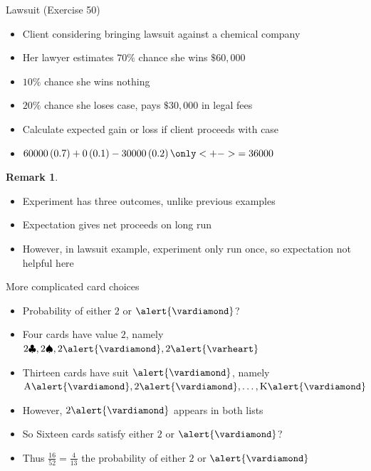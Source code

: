 \documentclass[handout]{beamer}
\theoremstyle{definition}
\newtheorem{remark}{Remark}
\begin{document}
\begin{frame}{Lawsuit (Exercise 50)}
\begin{itemize}
\item Client considering bringing lawsuit against a chemical company
\item Her lawyer estimates $70\%$ chance she wins $\$60,000$
\item $10\%$ chance she wins nothing
\item $20\%$ chance she loses case, pays $\$30,000$ in legal fees
\item Calculate expected gain or loss if client proceeds with case
\item $60000\left(0.7\right)
+0\left(0.1\right)-30000\left(0.2\right)
\only<+->{=36000}$
\end{itemize}
\begin{remark}
\begin{itemize}
\item Experiment has \alert{three} outcomes, unlike previous examples
\item Expectation gives net proceeds \alert{on long run}
\item However, in lawsuit example, experiment only run once,
so expectation not helpful here
\end{itemize}
\end{remark}
\end{frame}

\begin{frame}{More complicated card choices}
\begin{itemize}
\item Probability of \alert{either} $2$ or $\alert{\vardiamond}$?
\item Four cards have value $2$, namely
$2\clubsuit, 2\spadesuit, 2\alert{\vardiamond}, 2\alert{\varheart}$
\item Thirteen cards have suit $\alert{\vardiamond}$, namely
$\text{A}\alert{\vardiamond},2\alert{\vardiamond},\ldots,
\text{K}\alert{\vardiamond}$
\item However, $2\alert{\vardiamond}$ appears in \alert{both} lists
\item So Sixteen cards satisfy \alert{either} $2$ or $\alert{\vardiamond}$?
\item Thus $\frac{16}{52}=\frac{4}{13}$ the probability of
\alert{either} $2$ or $\alert{\vardiamond}$
\end{itemize}
\end{frame}
\end{document}
